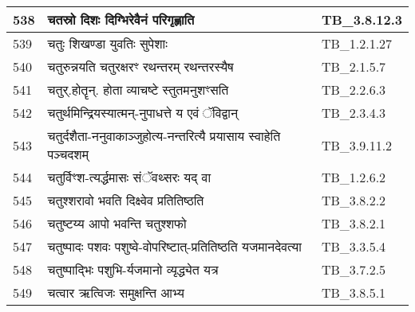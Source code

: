 \documentclass[17pt]{extarticle}
\begin{document}
\begin{longtable}{||p{0.4in}||p{4.9in}||p{0.9in}||}
    \hline
        
    538 & चतस्रो दिशः दिग्भिरेवैनं परिगृह्णाति & TB\_3.8.12.3       \\
    
    \hline
        
    539 & चतुः शिखण्डा युवतिः सुपेशाः & TB\_1.2.1.27       \\
    
    \hline
        
    540 & चतुरुन्नयति चतुरक्षरꣳ रथन्तरम् रथन्तरस्यैष & TB\_2.1.5.7       \\
    
    \hline
        
    541 & चतुर्.होतॄन्. होता व्याचष्टे स्तुतमनुशꣳसति & TB\_2.2.6.3       \\
    
    \hline
        
    542 & चतुर्थमिन्द्रियस्यात्मन्{-}नुपाधत्ते य एवं ॅविद्वान् & TB\_2.3.4.3       \\
    
    \hline
        
    543 & चतुर्दशैता{-}ननुवाकाञ्जुहोत्य{-}नन्तरित्यै प्रयासाय स्वाहेति पञ्चदशम् & TB\_3.9.11.2       \\
    
    \hline
        
    544 & चतुर्विꣳश{-}त्यर्द्धमासः संॅवथ्सरः यद् वा & TB\_1.2.6.2       \\
    
    \hline
        
    545 & चतुश्शरावो भवति दिक्ष्वेव प्रतितिष्ठति & TB\_3.8.2.2       \\
    
    \hline
        
    546 & चतुष्टय्य आपो भवन्ति चतुश्शफो & TB\_3.8.2.1       \\
    
    \hline
        
    547 & चतुष्पादः पशवः पशुष्वे{-}वोपरिष्टात्{-}प्रतितिष्ठति यजमानदेवत्या & TB\_3.3.5.4       \\
    
    \hline
        
    548 & चतुष्पाद्भिः पशुभि{-}र्यजमानो व्यृद्ध्येत यत्र & TB\_3.7.2.5       \\
    
    \hline
        
    549 & चत्वार ऋत्विजः समुक्षन्ति आभ्य & TB\_3.8.5.1       \\
    

\end{longtable}
\end{document}
